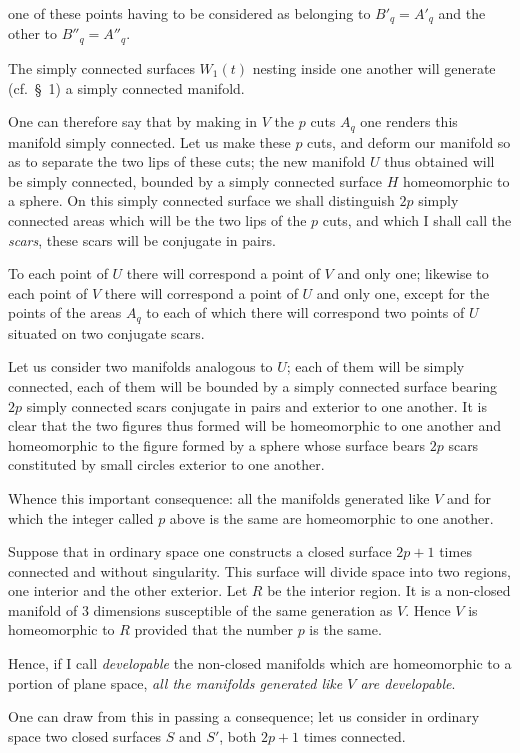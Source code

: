 \documentclass{article}
\begin{document}
one of these points having to be considered as belonging to $B'_{q} = A'_{q}$ and the other to $B''_{q} = A''_{q}$.

The simply connected surfaces $W_{1}(t)$ nesting inside one another will generate (cf.\ \S~1) a simply connected manifold.

One can therefore say that by making in $V$ the $p$ cuts $A_{q}$ one renders this manifold simply connected. Let us make these $p$ cuts, and deform our manifold so as to separate the two lips of these cuts; the new manifold $U$ thus obtained will be simply connected, bounded by a simply connected surface $H$ homeomorphic to a sphere. On this simply connected surface we shall distinguish $2p$ simply connected areas which will be the two lips of the $p$ cuts, and which I shall call the \emph{scars}, these scars will be conjugate in pairs.

To each point of $U$ there will correspond a point of $V$ and only one; likewise to each point of $V$ there will correspond a point of $U$ and only one, except for the points of the areas $A_{q}$ to each of which there will correspond two points of $U$ situated on two conjugate scars.

Let us consider two manifolds analogous to $U$; each of them will be simply connected, each of them will be bounded by a simply connected surface bearing $2p$ simply connected scars conjugate in pairs and exterior to one another. It is clear that the two figures thus formed will be homeomorphic to one another and homeomorphic to the figure formed by a sphere whose surface bears $2p$ scars constituted by small circles exterior to one another.

Whence this important consequence: all the manifolds generated like $V$ and for which the integer called $p$ above is the same are homeomorphic to one another.

Suppose that in ordinary space one constructs a closed surface $2p + 1$ times connected and without singularity. This surface will divide space into two regions, one interior and the other exterior. Let $R$ be the interior region. It is a non-closed manifold of 3 dimensions susceptible of the same generation as $V$. Hence $V$ is homeomorphic to $R$ provided that the number $p$ is the same.

Hence, if I call \emph{developable} the non-closed manifolds which are homeomorphic to a portion of plane space, \emph{all the manifolds generated like $V$ are developable}.

One can draw from this in passing a consequence; let us consider in ordinary space two closed surfaces $S$ and $S'$, both $2p + 1$ times connected.
\end{document}
